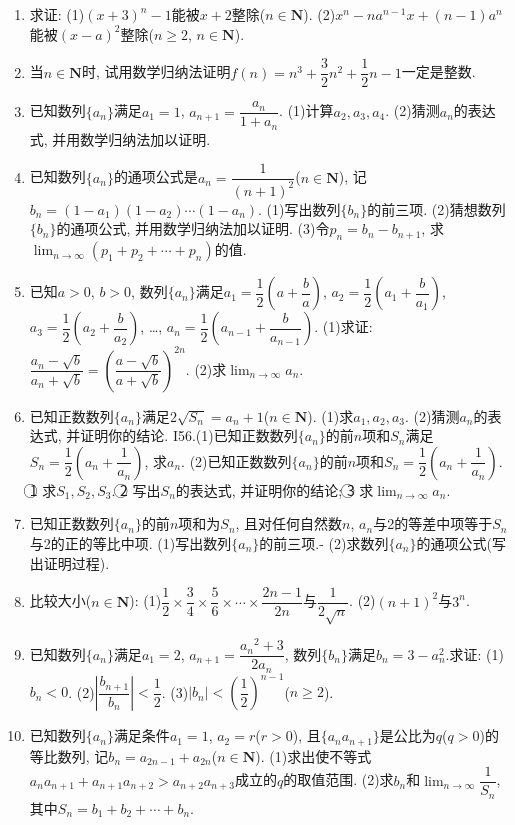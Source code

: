 \documentclass[10pt,a4paper]{article}
\begin{document}
\begin{enumerate}[1.]
\item 求证:
(1)$(x+3)^n-1$能被$x+2$整除($n\in \mathbf{N}$).
(2)$x^n-na^{n-1}x+(n-1)a^n$能被$(x-a)^2$整除($n\ge 2$, $n\in \mathbf{N}$).
\item 当$n\in \mathbf{N}$时, 试用数学归纳法证明$f(n)=n^3+\dfrac 32n^2+\dfrac 12n-1$一定是整数.
\item 已知数列$\{a_n\}$满足$a_1=1$, $a_{n+1}=\dfrac{a_n}{1+{a_n}}$.
(1)计算$a_2,a_3,a_4$.
(2)猜测$a_n$的表达式, 并用数学归纳法加以证明.
\item 已知数列$\{a_n\}$的通项公式是$a_n=\dfrac 1{(n+1)^2}$($n\in \mathbf{N}$), 记$b_n=(1-a_1)(1-a_2)\cdots (1-a_n)$.
(1)写出数列$\{b_n\}$的前三项.
(2)猜想数列$\{b_n\}$的通项公式, 并用数学归纳法加以证明.
(3)令$p_n=b_n-b_{n+1}$, 求$\displaystyle \lim_{n\to \infty} (p_1+p_2+\cdots +p_n)$的值.
\item 已知$a>0$, $b>0$, 数列$\{a_n\}$满足$a_1=\dfrac 12(a+\dfrac ba)$, $a_2=\dfrac 12(a_1+\dfrac b{a_1})$, $a_3=\dfrac 12(a_2+\dfrac b{a_2})$, …, $a_n=\dfrac 12(a_{n-1}+\dfrac b{a_{n-1}})$.
(1)求证: $\dfrac{{a_n}-\sqrt b}{{a_n}+\sqrt b}=(\dfrac{a-\sqrt b}{a+\sqrt b})^{2n}$.
(2)求$\displaystyle \lim_{n\to \infty} a_n$.
\item 已知正数数列$\{a_n\}$满足$2\sqrt {S_n}=a_n+1$($n\in \mathbf{N}$).
(1)求$a_1,a_2,a_3$.
(2)猜测$a_n$的表达式, 并证明你的结论.
I56.(1)已知正数数列$\{a_n\}$的前$n$项和$S_n$满足$S_n=\dfrac 12(a_n+\dfrac 1{a_n})$, 求$a_n$.
(2)已知正数数列$\{a_n\}$的前$n$项和$S_n=\dfrac 12(a_n+\dfrac 1{a_n})$.
\textcircled{1} 求$S_1,S_2,S_3$.
\textcircled{2} 写出$S_n$的表达式, 并证明你的结论;
\textcircled{3} 求$\displaystyle \lim_{n\to \infty} a_n$.
\item 已知正数数列$\{a_n\}$的前$n$项和为$S_n$, 且对任何自然数$n$, $a_n$与2的等差中项等于$S_n$与2的正的等比中项.
(1)写出数列$\{a_n\}$的前三项.-
    (2)求数列$\{a_n\}$的通项公式(写出证明过程).
\item 比较大小($n\in \mathbf{N}$):
(1)$\dfrac 12\times \dfrac 34\times \dfrac 56\times \cdots \times \dfrac{2n-1}{2n}$与$\dfrac 1{2\sqrt n}$.
(2)$(n+1)^2$与$3^n$.
\item 已知数列$\{a_n\}$满足$a_1=2$, $a_{n+1}=\dfrac{{a_n}^2+3}{2{a_n}}$, 数列$\{b_n\}$满足$b_n=3-a_n^2$.求证:
(1)$b_n<0$.
(2)$|\dfrac{{b_{n+1}}}{b_n}|<\dfrac 12$.
(3)$|b_n|<(\dfrac 12)^{n-1}$($n\ge 2$).
\item 已知数列$\{a_n\}$满足条件$a_1=1$, $a_2=r$($r>0$), 且$\{a_na_{n+1}\}$是公比为$q$($q>0$)的等比数列, 记$b_n=a_{2n-1}+a_{2n}$($n\in \mathbf{N}$).
(1)求出使不等式$a_na_{n+1}+a_{n+1}a_{n+2}>a_{n+2}a_{n+3}$成立的$q$的取值范围.
(2)求$b_n$和$\displaystyle \lim_{n\to \infty} \dfrac 1{S_n}$, 其中$S_n=b_1+b_2+\cdots +b_n$.

\end{enumerate}
\end{document}
